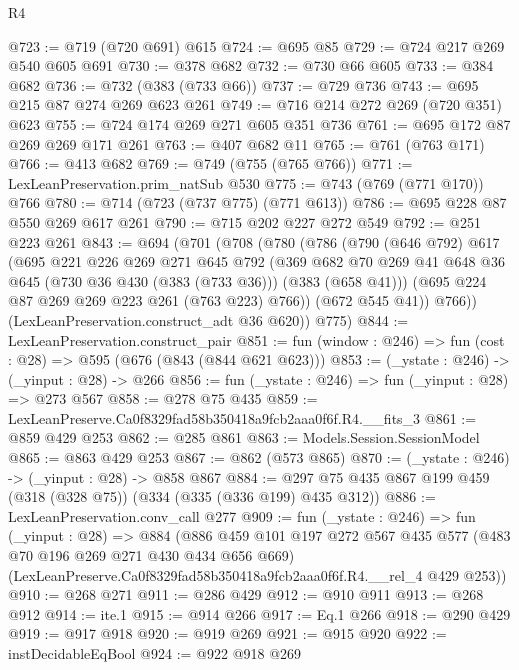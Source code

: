 \begin{lexlean}{R4}
\begin{coremodule}
@723 := @719 (@720 @691) @615
@724 := @695 @85
@729 := @724 @217 @269 @540 @605 @691
@730 := @378 @682
@732 := @730 @66 @605
@733 := @384 @682
@736 := @732 (@383 (@733 @66))
@737 := @729 @736
@743 := @695 @215 @87 @274 @269 @623 @261
@749 := @716 @214 @272 @269 (@720 @351) @623
@755 := @724 @174 @269 @271 @605 @351 @736
@761 := @695 @172 @87 @269 @269 @171 @261
@763 := @407 @682 @11
@765 := @761 (@763 @171)
@766 := @413 @682
@769 := @749 (@755 (@765 @766))
@771 := LexLeanPreservation.prim_natSub @530
@775 := @743 (@769 (@771 @170)) @766
@780 := @714 (@723 (@737 @775) (@771 @613))
@786 := @695 @228 @87 @550 @269 @617 @261
@790 := @715 @202 @227 @272 @549
@792 := @251 @223 @261
@843 := @694
    (@701
      (@708
        (@780
          (@786
            (@790
              (@646 @792)
              @617
              (@695
                @221
                @226
                @269
                @271
                @645
                @792
                (@369
                  @682
                  @70
                  @269
                  @41
                  @648
                  @36
                  @645
                  (@730 @36 @430 (@383 (@733 @36)))
                  (@383 (@658 @41)))
                (@695 @224 @87 @269 @269 @223 @261 (@763 @223) @766))
              (@672 @545 @41))
            @766))
        (LexLeanPreservation.construct_adt @36 @620))
      @775)
@844 := LexLeanPreservation.construct_pair
@851 := fun (window : @246) => fun (cost : @28) => @595 (@676 (@843 (@844 @621 @623)))
@853 := (_ystate : @246) -> (_yinput : @28) -> @266
@856 := fun (_ystate : @246) => fun (_yinput : @28) => @273 @567
@858 := @278 @75 @435
@859 := LexLeanPreserve.Ca0f8329fad58b350418a9fcb2aaa0f6f.R4.__fits_3
@861 := @859 @429 @253
@862 := @285 @861
@863 := Models.Session.SessionModel
@865 := @863 @429 @253
@867 := @862 (@573 @865)
@870 := (_ystate : @246) -> (_yinput : @28) -> @858 @867
@884 := @297 @75 @435 @867 @199 @459 (@318 (@328 @75)) (@334 (@335 (@336 @199) @435 @312))
@886 := LexLeanPreservation.conv_call @277
@909 := fun (_ystate : @246) =>
  fun (_yinput : @28) =>
  @884
    (@886
      @459
      @101
      @197
      @272
      @567
      @435
      @577
      (@483 @70 @196 @269 @271 @430 @434 @656 @669)
      (LexLeanPreserve.Ca0f8329fad58b350418a9fcb2aaa0f6f.R4.__rel_4 @429 @253))
@910 := @268 @271
@911 := @286 @429
@912 := @910 @911
@913 := @268 @912
@914 := ite.{1}
@915 := @914 @266
@917 := Eq.{1} @266
@918 := @290 @429
@919 := @917 @918
@920 := @919 @269
@921 := @915 @920
@922 := instDecidableEqBool
@924 := @922 @918 @269

\end{coremodule}
\end{lexlean}
